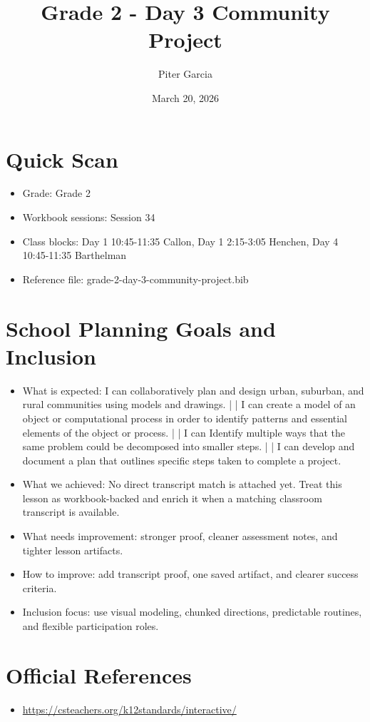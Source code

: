 \documentclass[11pt]{article}
\title{Grade 2 - Day 3 Community Project}
\author{Piter Garcia}
\date{March 20, 2026}
\begin{document}
\maketitle
\section*{Quick Scan}
\begin{itemize}[leftmargin=*]
\item Grade: Grade 2
\item Workbook sessions: Session 34
\item Class blocks: Day 1 10:45-11:35 Callon, Day 1 2:15-3:05 Henchen, Day 4 10:45-11:35 Barthelman
\item Reference file: grade-2-day-3-community-project.bib
\end{itemize}
\section*{School Planning Goals and Inclusion}
\begin{itemize}[leftmargin=*]
\item What is expected: I can collaboratively plan and design urban, suburban, and rural communities using models and drawings. | | I can create a model of an object or computational process in order to identify patterns and essential elements of the object or process. | | I can Identify multiple ways that the same problem could be decomposed into smaller steps. | | I can develop and document a plan that outlines specific steps taken to complete a project.
\item What we achieved: No direct transcript match is attached yet. Treat this lesson as workbook-backed and enrich it when a matching classroom transcript is available.
\item What needs improvement: stronger proof, cleaner assessment notes, and tighter lesson artifacts.
\item How to improve: add transcript proof, one saved artifact, and clearer success criteria.
\item Inclusion focus: use visual modeling, chunked directions, predictable routines, and flexible participation roles.
\end{itemize}
\section*{Official References}
\begin{itemize}[leftmargin=*]
\item \url{https://csteachers.org/k12standards/interactive/}

\end{itemize}
\end{document}
